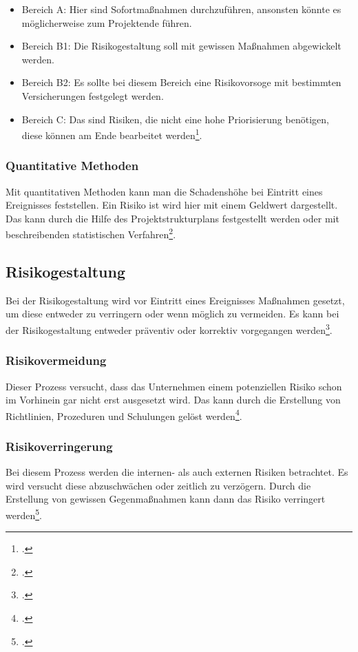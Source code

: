 \begin{itemize}
	\item Bereich A: Hier sind Sofortmaßnahmen durchzuführen, ansonsten könnte es möglicherweise zum Projektende führen.
	\item Bereich B1: Die Risikogestaltung soll mit gewissen Maßnahmen abgewickelt werden.
	\item Bereich B2: Es sollte bei diesem Bereich eine Risikovorsoge mit bestimmten Versicherungen festgelegt werden.
	\item Bereich C: Das sind Risiken, die nicht eine hohe Priorisierung benötigen, diese können am Ende bearbeitet werden\footcite{risikomanagement-diplomarbeit}.
\end{itemize}

\subsubsection{Quantitative Methoden}
Mit quantitativen Methoden kann man die Schadenshöhe bei Eintritt eines Ereignisses feststellen. Ein Risiko ist wird hier mit einem Geldwert dargestellt.
Das kann durch die Hilfe des Projektstrukturplans festgestellt werden oder mit beschreibenden statistischen Verfahren\footcite{risikomanagement-diplomarbeit}.


\subsection{Risikogestaltung}
Bei der Risikogestaltung wird vor Eintritt eines Ereignisses Maßnahmen gesetzt, um diese entweder zu verringern oder wenn möglich zu vermeiden.
Es kann bei der Risikogestaltung entweder präventiv oder korrektiv vorgegangen werden\footcite{risikomanagement-diplomarbeit}.

\subsubsection{Risikovermeidung}
Dieser Prozess versucht, dass das Unternehmen einem potenziellen Risiko schon im Vorhinein gar nicht erst ausgesetzt wird. Das kann durch die Erstellung von Richtlinien, Prozeduren und Schulungen gelöst werden\footcite{risikomanagement-diplomarbeit}.

\subsubsection{Risikoverringerung}
Bei diesem Prozess werden die internen- als auch externen Risiken betrachtet. Es wird versucht diese abzuschwächen oder zeitlich zu verzögern. Durch die Erstellung von gewissen Gegenmaßnahmen kann dann das Risiko verringert werden\footcite{risikomanagement-diplomarbeit}.

